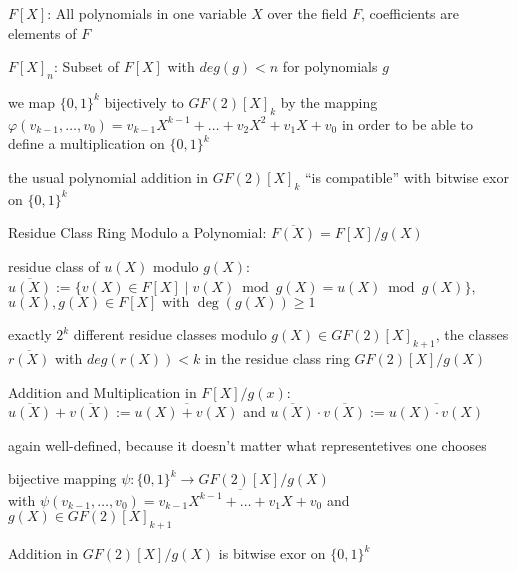 \documentclass[landscape, a4paper]{article}
\begin{document}
\begin{minipage}[t]{0.198\pagewidth}
	\begin{betterlist}
		\item $F[X]$: All polynomials in one variable $X$ over the field $F$, coefficients are elements of $F$
		\item $F[X]_n$: Subset of $F[X]$ with $deg(g) < n$ for polynomials $g$
		\item we map $\{0,1\}^k$ bijectively to $GF(2)[X]_k$ by the mapping $\varphi(v_{k-1}, \ldots, v_0) = v_{k-1} X^{k-1} + \ldots + v_2 X^2 + v_1 X + v_0$ in order to be able to define a \alert{multiplication} on $\{0,1\}^k$
		\begin{betterlist}
			\item the usual \alert{polynomial addition} in $GF(2)[X]_k$ \enquote{is compatible} with bitwise exor on $\{0,1\}^k$
		\end{betterlist}
		\item \alert{Residue Class Ring Modulo a Polynomial:} $\overline{F(X)} = F[X] / g(X)$%
		\begin{betterlist}
			\item \alert{residue class of $u(X)$ modulo $g(X)$}: $\overline{u(X)}:=\{v(X) \in F[X] \mid v(X) \bmod g(X)=u(X) \bmod g(X)\}$,\quad$u(X),g(X) \in F[X] \text { with } \operatorname{deg}(g(X))\geq 1$
			\item exactly $2^k$ different residue classes modulo $g(X)\in GF(2)[X]_{k+1}$, the classes $\overline{r(X)}$ with $deg(r(X)) < k$ in the residue class ring $GF(2)[X]/g(X)$
			\item \alert{Addition and Multiplication in $F[X]/g(x)$:} $\overline{u(X)}+\overline{v(X)}:=\overline{u(X)+v(X)}$ and $\overline{u(X)} \cdot \overline{v(X)}:=\overline{u(X) \cdot v(X)}$
			\begin{betterlist}
				\item again well-defined, because it doesn't matter what representetives one chooses
				\item \alert{bijective mapping} $\psi:\{0,1\}^k\rightarrow G F(2)[X] / g(X)$\\
				with $\psi\left(v_{k-1}, \ldots, v_0\right)=\overline{v_{k-1} X^{k-1}+\ldots+v_1 X+v_0}$ and $g(X)\in GF(2)[X]_{k+1}$
				\item \alert{Addition} in $GF(2)[X]/g(X)$ is bitwise exor on $\{0,1\}^k$%

\end{betterlist}
\end{betterlist}
\end{betterlist}
\end{minipage}
\end{document}

